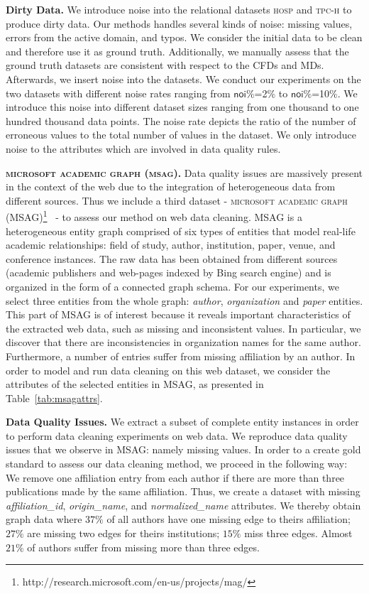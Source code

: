 \textbf{Dirty Data.} We introduce noise into the relational datasets \textsc{hosp} and \textsc{tpc-h} to produce dirty data. Our methods handles several kinds of noise: missing values, errors from the active domain, and typos. We consider the initial data to be clean and therefore use it as ground truth. Additionally, we manually assess that the ground truth datasets are consistent with respect to the CFDs and MDs. Afterwards, we insert noise into the datasets. We conduct our experiments on the two datasets with different noise rates ranging from $\mathsf{noi\%}$=2$\%$ to $\mathsf{noi\%}$=10$\%$. We introduce this noise into different dataset sizes ranging from one thousand to one hundred thousand data points. The noise rate depicts the ratio of the number of erroneous values to the total number of values in the dataset. We only introduce noise to the attributes which are involved in data quality rules.

\textbf{\textsc{microsoft academic graph (msag)}.} Data quality issues are massively present in the context of the web due to the integration of heterogeneous data from different sources. Thus we include a third dataset - \textsc{microsoft academic graph (MSAG)}\footnote{http://research.microsoft.com/en-us/projects/mag/}~\cite{msag2015} - to assess our method on web data cleaning. MSAG is a heterogeneous entity graph comprised of six types of entities that model real-life academic relationships: field of study, author, institution, paper, venue, and conference instances. The raw data has been obtained from different sources (academic publishers and web-pages indexed by Bing search engine) and is organized in the form of a connected graph schema. For our experiments, we select three entities from the whole graph: \textit{author}, \textit{organization} and \textit{paper} entities. This part of \textsc{MSAG} is of interest because it reveals important characteristics of the extracted web data, such as missing and inconsistent values. In particular, we discover that there are inconsistencies in organization names for the same author. Furthermore, a number of entries suffer from missing affiliation by an author. In order to model and run data cleaning on this web dataset, we consider the attributes of the selected entities in \textsc{MSAG}, as presented in Table~\ref{tab:msagattrs}. 

\textbf{Data Quality Issues.} We extract a subset of complete entity instances in order to perform data cleaning experiments on web data. We reproduce data quality issues that we observe in \textsc{MSAG}: namely missing values. In order to a create gold standard to assess our data cleaning method, we proceed in the following way: We remove one affiliation entry from each author if there are more than three publications made by the same affiliation. Thus, we create a dataset with missing \textsl{affiliation\_id}, \textsl{origin\_name}, and \textsl{normalized\_name} attributes. We thereby obtain graph data where $37\%$ of all authors have one missing edge to theirs affiliation; $27\%$ are missing two edges for theirs institutions; $15\%$ miss three edges. Almost $21\%$ of authors suffer from missing more than three edges. 

